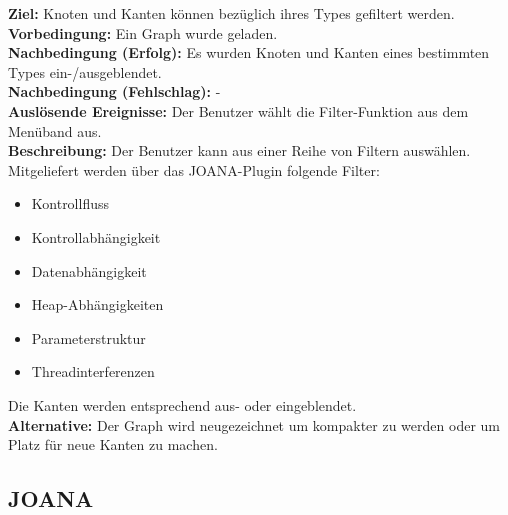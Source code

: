 \label{fa:filter}
\textbf{Ziel:} Knoten und Kanten können bezüglich ihres Types gefiltert werden.\\
\textbf{Vorbedingung:} Ein Graph wurde geladen.\\
\textbf{Nachbedingung (Erfolg):} Es wurden Knoten und Kanten eines bestimmten Types ein-/ausgeblendet.\\
\textbf{Nachbedingung (Fehlschlag):} -\\
\textbf{Auslösende Ereignisse:}
Der Benutzer wählt die Filter-Funktion aus dem Menüband aus.\\
\textbf{Beschreibung:}
Der Benutzer kann aus einer Reihe von Filtern auswählen.
Mitgeliefert werden über das JOANA-Plugin folgende Filter: %
\begin{itemize}[nolistsep]
  \item Kontrollfluss
  \item Kontrollabhängigkeit
  \item Datenabhängigkeit
  \item Heap-Abhängigkeiten
  \item Parameterstruktur
  \item Threadinterferenzen
\end{itemize}
Die Kanten werden entsprechend aus- oder eingeblendet.\\
\textbf{Alternative:}
Der Graph wird neugezeichnet um kompakter zu werden oder um Platz für neue Kanten zu machen.

\subsection{JOANA}

